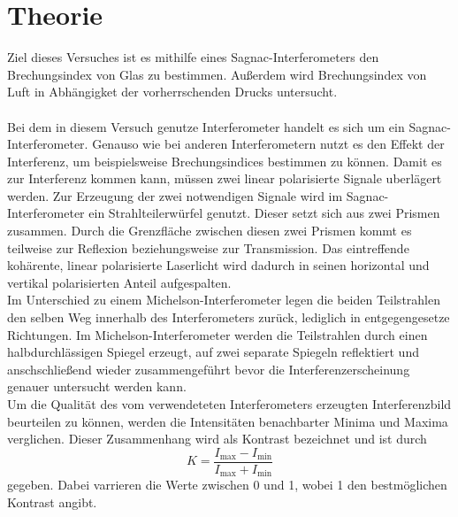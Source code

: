 \section{Theorie}
Ziel dieses Versuches ist es mithilfe eines Sagnac-Interferometers den Brechungsindex von Glas
zu bestimmen. Außerdem wird Brechungsindex von Luft in Abhängigket der vorherrschenden 
Drucks untersucht. \\
\\ 
Bei dem in diesem Versuch genutze Interferometer handelt es sich um ein Sagnac-Interferometer. 
Genauso wie bei anderen Interferometern nutzt es den Effekt der Interferenz, um beispielsweise 
Brechungsindices bestimmen zu können. Damit es zur Interferenz kommen kann, müssen zwei linear 
polarisierte Signale uberlägert werden. Zur Erzeugung der zwei notwendigen Signale wird im Sagnac-Interferometer 
ein Strahlteilerwürfel genutzt. Dieser setzt sich aus zwei Prismen zusammen. Durch die Grenzfläche 
zwischen diesen zwei Prismen kommt es teilweise zur Reflexion beziehungsweise zur Transmission. 
Das eintreffende kohärente, linear polarisierte Laserlicht wird dadurch in seinen horizontal und 
vertikal polarisierten Anteil aufgespalten. \\
Im Unterschied zu einem Michelson-Interferometer legen die beiden Teilstrahlen den selben Weg
innerhalb des Interferometers zurück, lediglich in entgegengesetze Richtungen. Im
Michelson-Interferometer werden die Teilstrahlen durch einen halbdurchlässigen Spiegel erzeugt,
auf zwei separate Spiegeln reflektiert und anschschließend wieder zusammengeführt bevor die 
Interferenzerscheinung genauer untersucht werden kann.
\\
Um die Qualität des vom verwendeteten Interferometers erzeugten Interferenzbild beurteilen zu können,
werden die Intensitäten benachbarter Minima und Maxima verglichen. Dieser Zusammenhang wird 
als Kontrast bezeichnet und ist durch 
\begin{equation}
    K = \frac{I_\text{max}-I_\text{min}}{I_\text{max}+I_\text{min}}
\end{equation} \noindent 
gegeben. Dabei varrieren die Werte zwischen 0 und 1, wobei 1 den bestmöglichen Kontrast angibt. 